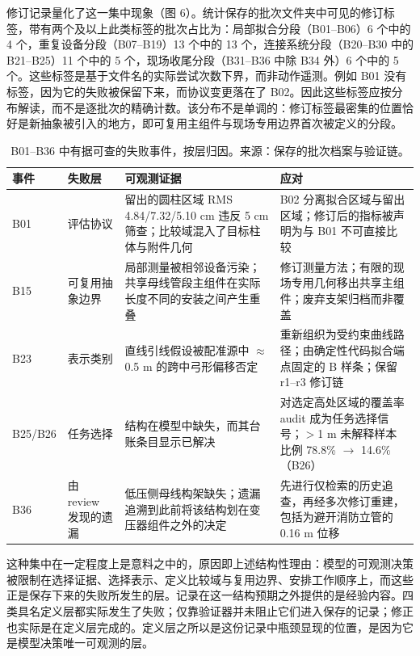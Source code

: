 \documentclass[10pt,a4paper]{article}
\begin{document}
修订记录量化了这一集中现象（图
6）。统计保存的批次文件夹中可见的修订标签，带有两个及以上此类标签的批次占比为：局部拟合分段（B01--B06）6
个中的 4 个，重复设备分段（B07--B19）13 个中的 13
个，连接系统分段（B20--B30 中的 B21--B25）11 个中的 5
个，现场收尾分段（B31--B36 中除 B34 外）6 个中的 5
个。这些标签是基于文件名的实际尝试次数下界，而非动作遥测。例如 B01
没有标签，因为它的失败被保留下来，而协议变更落在了
B02。因此这些标签应按分布解读，而不是逐批次的精确计数。该分布不是单调的：修订标签最密集的位置恰好是新抽象被引入的地方，即可复用主组件与现场专用边界首次被定义的分段。

\begin{table}[t]
\centering
\caption{B01--B36 中有据可查的失败事件，按层归因。来源：保存的批次档案与验证链。}
\label{tab:failures}
\small
\setlength{\tabcolsep}{5pt}
\renewcommand{\arraystretch}{1.12}
\begin{tabularx}{\textwidth}{@{}p{}p{}XX@{}}
\toprule
\textbf{事件} & \textbf{失败层} & \textbf{可观测证据} & \textbf{应对} \\
\midrule
B01 & 评估协议 & 留出的圆柱区域 RMS 4.84/7.32/5.10 cm 违反 5 cm 筛查；比较域混入了目标柱体与附件几何 & B02 分离拟合区域与留出区域；修订后的指标被声明为与 B01 不可直接比较 \\
B15 & 可复用抽象边界 & 局部测量被相邻设备污染；共享母线管段主组件在实际长度不同的安装之间产生重叠 & 修订测量方法；有限的现场专用几何移出共享主组件；废弃支架归档而非覆盖 \\
B23 & 表示类别 & 直线引线假设被配准源中 $\approx$0.5 m 的跨中弓形偏移否定 & 重新组织为受约束曲线路径；由确定性代码拟合端点固定的 B 样条；保留 r1--r3 修订链 \\
B25/B26 & 任务选择 & 结构在模型中缺失，而其台账条目显示已解决 & 对选定高处区域的覆盖率 audit 成为任务选择信号；$>$1 m 未解释样本比例 78.8\% $\rightarrow$ 14.6\%（B26） \\
B36 & 由 review 发现的遗漏 & 低压侧母线构架缺失；遗漏追溯到此前将该结构划在变压器组件之外的决定 & 先进行仅检索的历史追查，再经多次修订重建，包括为避开消防立管的 0.16 m 位移 \\
\bottomrule
\end{tabularx}
\end{table}

这种集中在一定程度上是意料之中的，原因即上述结构性理由：模型的可观测决策被限制在选择证据、选择表示、定义比较域与复用边界、安排工作顺序上，而这些正是保存下来的失败所发生的层。记录在这一结构预期之外提供的是经验内容。四类具名定义层都实际发生了失败；仅靠验证器并未阻止它们进入保存的记录；修正也实际是在定义层完成的。定义层之所以是这份记录中瓶颈显现的位置，是因为它是模型决策唯一可观测的层。
\end{document}
